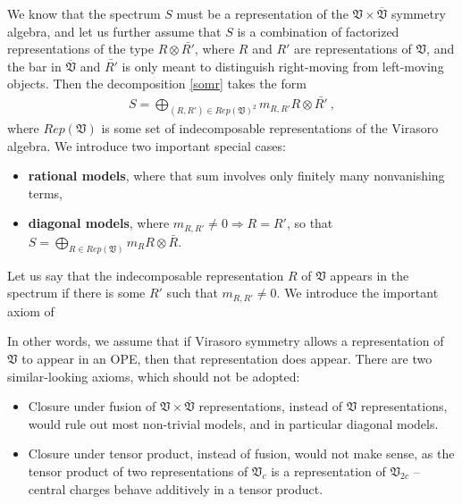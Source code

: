 \documentclass[12pt,a4paper,notitlepage]{report}
\numberwithin{equation}{section}
\theoremstyle{break}
\begin{document}
We know that the spectrum $S$ must be a representation of the 
$\mathfrak{V}\times \overline{\mathfrak{V}}$ symmetry algebra, and let us further assume that $S$ is a combination of factorized representations of the type $R\otimes \bar{R'}$, where $R$ and $R'$ are representations of $\mathfrak{V}$, and the bar in $\overline{\mathfrak{V}}$ and $\bar{R'}$ is only meant to distinguish right-moving from left-moving objects. Then the decomposition \eqref{somr} takes the form
\begin{align}
 \boxed{S = \bigoplus_{(R,R')\in Rep(\mathfrak{V})^2} m_{R,R'} R\otimes \bar{R'}}\ ,
\label{sorr}
\end{align}
where $Rep(\mathfrak{V})$ is some set of indecomposable representations of the Virasoro algebra.
We introduce two important special cases:
\begin{itemize}
\item \textbf{\boldmath rational models}, where that sum involves only finitely many nonvanishing terms,
 \item \textbf{\boldmath diagonal models}, where $m_{R,R'}\neq 0 \Rightarrow R=R'$, so that $S=\bigoplus_{R\in Rep(\mathfrak{V})} m_R R\otimes \bar{R}$.
\end{itemize}
Let us say that the indecomposable representation $R$ of $\mathfrak{V}$ appears in the spectrum if there is some $R'$ such that $m_{R,R'} \neq 0$.
We introduce the important axiom of 
\begin{center}
\end{center}
In other words, we assume that if Virasoro symmetry allows a representation of $\mathfrak{V}$ to appear in an OPE, then that representation does appear.
There are two similar-looking axioms, which should not be adopted:
\begin{itemize}
 \item Closure under fusion of $\mathfrak{V}\times \overline{\mathfrak{V}}$ representations, instead of $\mathfrak{V}$ representations, would rule out most non-trivial models, and in particular diagonal models. 
\item Closure under tensor product, instead of fusion, would not make sense, as the tensor product of two representations of $\mathfrak{V}_c$ is a representation of $\mathfrak{V}_{2c}$ -- central charges behave additively in a tensor product. 
\end{itemize}
\end{document}
